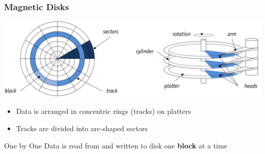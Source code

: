 \begin{frame}
    \frametitle{Magnetic Disks}
    \includegraphics[width=1\linewidth]{assets/images/magneticDisks.png}
    \begin{itemize}
        \item Data is arranged in concentric rings (tracks) on platters 
        \item Tracks are divided into arc-shaped sectors
    \end{itemize}
    \begin{alertblock}{One by One}
        Data is read from and written to disk one \textbf{block} at a time
        \end{alertblock}
\end{frame}